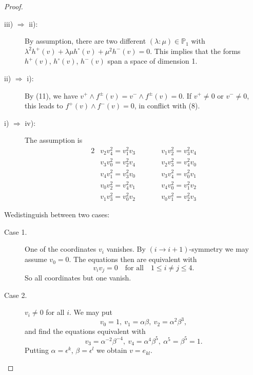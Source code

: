\begin{proof}
\begin{description}
\item[iii) $\Rightarrow$ ii):]
By assumption, there are two different $(\lambda:\mu)\in\mathbb{P}_{1}$ with $\lambda^{2}h^{+}(v)+\lambda\mu h^{\circ}(v)+\mu^{2}h^{-}(v)=0$. This implies that the forms $h^{+}(v)$, $h^{\circ}(v)$, $h^{-}(v)$ span a space of dimension 1.

\item[ii) $\Rightarrow$ i):]
By (11), we have $v^{+}\wedge f^{\pm}(v)=v^{-}\wedge f^{\pm}(v)=0$. If
$v^{+}\neq 0$ or $v^{-}\neq 0$, this leads to $f^{+}(v)\wedge
f^{-}(v)=0$, in conflict with (8). 
 
\item[i) $\Rightarrow$ iv):]
The assumption is
\begin{alignat*}{2}
& v_{2}v^{2}_{4}=v^{2}_{1}v_{3} &\qquad&
v_{1}v^{2}_{2}=v^{2}_{3}v_{4}\\
& v_{3}v^{2}_{0}=v^{2}_{2}v_{4} &\qquad&
v_{2}v^{2}_{3}=v^{2}_{4}v_{0}\\
& v_{4}v^{2}_{1}=v^{2}_{3}v_{0} &\qquad&
v_{3}v^{2}_{4}=v^{2}_{0}v_{1}\\
& v_{0}v^{2}_{2}=v^{2}_{4}v_{1} &\qquad&
v_{4}v_{0}^{2}=v^{2}_{1}v_{2}\\
& v_{1}v^{2}_{3}=v^{2}_{0}v_{2} &\qquad& v_{0}v^{2}_{1}=v^{2}_{2}v_{3} 
\end{alignat*}
\end{description}

We\pageoriginale distinguish between two cases:

\begin{description}
\item[Case 1.] One of the coordinates $v_{i}$ vanishes. By $(i\to
i+1)$-symmetry we may assume $v_{0}=0$. The equations then are
equivalent with
$$
v_{i}v_{j}=0\quad\text{for all}\quad 1\leq i\neq j\leq 4.
$$
So all coordinates but one vanish.

\item[Case 2.] $v_{i}\neq 0$ for all $i$. We may put
$$
v_{0}=1, \ v_{1}=\alpha\beta, \ v_{2}=\alpha^{2}\beta^{3},
$$
and find the equations equivalent with
$$
v_{3}=\alpha^{-2}\beta^{-4}, \
v_{4}=\alpha^{4}\beta^{5}, \ \alpha^{5}=\beta^{5}=1. 
$$
Putting $\alpha=\epsilon^{k}$, $\beta=\epsilon^{l}$ we obtain
$v=e_{kl}$.


\end{description}
\end{proof}
